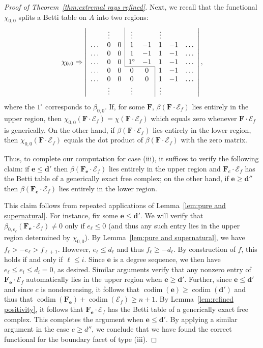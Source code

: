 \documentclass[12pt]{amsart}
\theoremstyle{definition}
\theoremstyle{remark}
\newcommand{\codim}{\operatorname{codim}}
\newcommand{\cc}{c}
\newcommand{\dd}{\mathbf{d}}
\newcommand{\ee}{\mathbf{e}}
\newcommand{\cE}{\mathcal{E}}
\newcommand{\FF}{\mathbf{F}}
\begin{document}
\begin{proof}[Proof of Theorem~\ref{thm:extremal rays refined}]
Next, we recall that the functional $\chi_{0,0}$ splits a Betti table on $A$ into two regions:
\[
\chi_{0,0}\Rightarrow 
\left|
\begin{array}{cccccccc}
 & \vdots& &\multicolumn{1}{|c}{\vdots}&& \vdots&&\\
\dots&0&0&\multicolumn{1}{|c}{1}&-1&1&-1&\dots\\
\dots&0&0&\multicolumn{1}{|c}{1}&-1&1&-1&\dots\\
\dots&0&0&\multicolumn{1}{|c}{1^\circ}&-1&1&-1&\dots\\ \cline{4-5}
\dots&0&0&0&0&\multicolumn{1}{|c}{1}&-1&\dots\\
\dots&0&0&0&0&\multicolumn{1}{|c}{1}&-1&\dots\\
& \vdots&&\vdots&& \multicolumn{1}{|c}{\vdots}&&\\
\end{array}
\right|,
\]
where the $1^\circ$ corresponds to $\beta_{0,0}$.   If, for some $\FF$, $\beta(\FF\cdot \cE_f)$ lies entirely in the upper region, then $\chi_{0,0}(\FF\cdot \cE_f)=\chi(\FF\cdot \cE_f)$ which equals zero whenever $\FF\cdot \cE_f$ is generically.  On the other hand, if $\beta(\FF\cdot \cE_f)$ lies entirely in the lower region, then $\chi_{0,0}(\FF\cdot \cE_f)$ equals the dot product of $\beta(\FF\cdot \cE_f)$ with the zero matrix.

Thus, to complete our computation for case (iii), it suffices to verify the following claim: if $\ee\leq \dd'$ then $\beta(\FF_{\ee}\cdot \cE_f)$ lies entirely in the upper region and $\FF_e\cdot \cE_f$ has the Betti table of a generically exact free complex; on the other hand, if $\ee\geq \dd''$ then $\beta(\FF_{\ee}\cdot \cE_f)$ lies entirely in the lower region.  

This claim follows from repeated applications of Lemma~\ref{lem:pure and supernatural}.  For instance, fix some $\ee\leq \dd'$.  We will verify that $\beta_{0,e_\ell}(\FF_{\ee}\cdot \cE_f)\ne 0$ only if $e_{\ell}\leq 0$ (and thus any such entry lies in the upper region determined by $\chi_{0,0}$).  By Lemma~\ref{lem:pure and supernatural}, we have
$
f_{\ell}>-e_{\ell}>f_{\ell+1}.
$
However, $e_{\ell}\leq d_{\ell}$ and thus $f_{\ell}\geq -d_{\ell}$.  By construction of $f$, this holds if and only if $\ell \leq i$.  Since $\ee$ is a degree sequence, we then have $e_{\ell}\leq e_i\leq d_i=0$, as desired.  Similar arguments verify that any nonzero entry of $\FF_{\ee}\cdot \cE_f$ automatically lies in the upper region when $\ee\geq \dd'$. Further, since $\ee\leq \dd'$ and since $\cc$ is nondecreasing, it follows that $\codim(\ee)\geq \codim(\dd')$ and thus that $\codim(\FF_{\ee})+\codim(\cE_f)\geq n+1$.  By Lemma~\ref{lem:refined positivity}, it follows that $\FF_{\ee}\cdot \cE_f$ has the Betti table of a generically exact free complex.  This completes the argument when $\ee\leq \dd'$.  By applying a similar argument in the case $e\geq d''$, we conclude that we have found the correct functional for the boundary facet of type (iii).


\end{proof}
\end{document}
